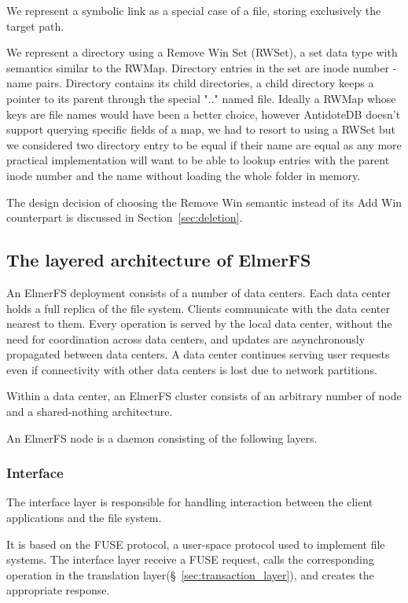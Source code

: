 \documentclass[sigconf, anonymous, 10pt]{acmart}
\begin{document}
We represent a symbolic link as a special case of a file, storing exclusively the target path.

We represent a directory using a Remove Win Set (RWSet), a set data type with semantics similar to the RWMap. Directory entries in the set are inode number - name pairs. Directory contains its child directories, a child directory keeps a pointer to its parent through the special ".." named file. Ideally a RWMap whose keys are file names would have been a better choice, however AntidoteDB doesn't support querying specific fields of a map, we had to resort to using a RWSet but we considered two directory entry to be equal if their name are equal as any more practical implementation will want to
be able to lookup entries with the parent inode number and the name without loading the whole folder in memory.

The design decision of choosing the Remove Win semantic instead of its Add Win counterpart is discussed in Section~\ref{sec:deletion}.

\subsection{The layered architecture of ElmerFS}

An ElmerFS deployment consists of a number of data centers.
Each data center holds a full replica of the file system.
Clients communicate with the data center nearest to them.
Every operation is served by the local data center, without the need
for coordination across data centers,
and updates are asynchronously propagated between data centers.
A data center continues serving user requests even if connectivity
with other data centers is lost due to network partitions.

Within a data center, an ElmerFS cluster consists of an arbitrary number
of node and a shared-nothing architecture.

An ElmerFS node is a daemon consisting of the following layers.

\subsubsection{Interface}

The interface layer is responsible for handling interaction between the client applications
and the file system.

It is based on the FUSE protocol, a user-space protocol used to implement
file systems. The interface layer receive a FUSE request, calls the corresponding operation in the translation layer(\S~\ref{sec:transaction_layer}), and creates the appropriate response.
\end{document}
